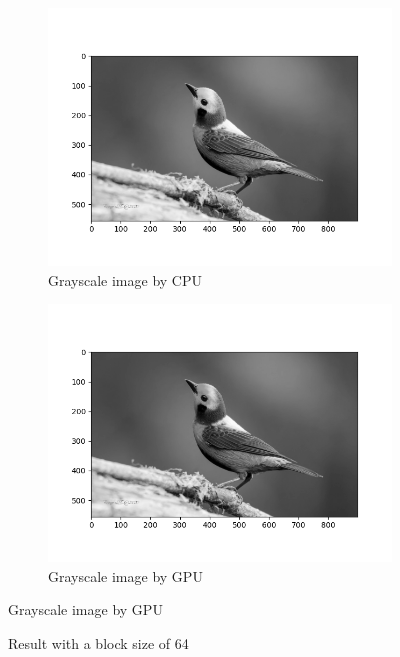 \documentclass{article}
\begin{document}
\begin{figure}[H]
\centering
\begin{subfigure}{.5\textwidth}
  \centering
  \includegraphics[scale=0.45]{images/lw3manual.png}
  \caption{Grayscale image by CPU}
  \label{fig:sub1}
\end{subfigure}%
\begin{subfigure}{.5\textwidth}
  \centering
  \includegraphics[scale=0.45]{images/lw3cuda.png}
  \caption{Grayscale image by GPU}
  \label{fig:sub2}
\end{subfigure}
\label{fig:test}
\end{figure}

\begin{figure}[H]
    \caption{Result with a block size of 64}
\end{figure}
\end{document}
